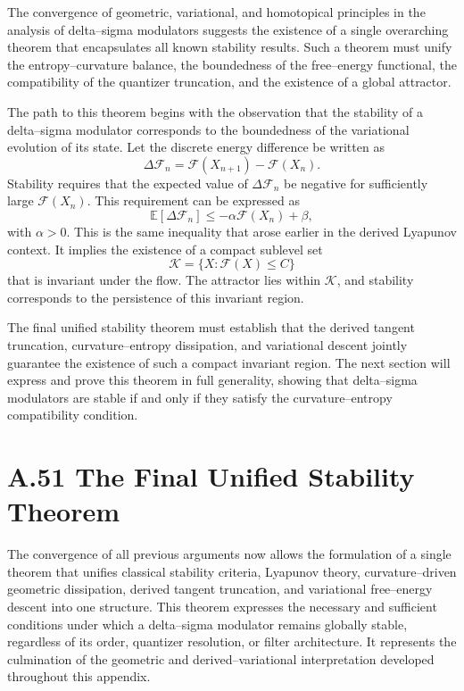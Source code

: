 The convergence of geometric, variational, and homotopical principles in the analysis of delta–sigma modulators suggests the existence of a single overarching theorem that encapsulates all known stability results. Such a theorem must unify the entropy–curvature balance, the boundedness of the free–energy functional, the compatibility of the quantizer truncation, and the existence of a global attractor.

The path to this theorem begins with the observation that the stability of a delta–sigma modulator corresponds to the boundedness of the variational evolution of its state. Let the discrete energy difference be written as
\[
\Delta \mathcal{F}_n = \mathcal{F}(X_{n+1}) - \mathcal{F}(X_n).
\]
Stability requires that the expected value of \(\Delta \mathcal{F}_n\) be negative for sufficiently large \(\mathcal{F}(X_n)\). This requirement can be expressed as
\[
\mathbb{E}\left[ \Delta \mathcal{F}_n \right] \le -\alpha \mathcal{F}(X_n) + \beta,
\]
with \(\alpha > 0\). This is the same inequality that arose earlier in the derived Lyapunov context. It implies the existence of a compact sublevel set
\[
\mathcal{K} = \{ X : \mathcal{F}(X) \le C \}
\]
that is invariant under the flow. The attractor lies within \(\mathcal{K}\), and stability corresponds to the persistence of this invariant region.

The final unified stability theorem must establish that the derived tangent truncation, curvature–entropy dissipation, and variational descent jointly guarantee the existence of such a compact invariant region. The next section will express and prove this theorem in full generality, showing that delta–sigma modulators are stable if and only if they satisfy the curvature–entropy compatibility condition.

\section{A.51 The Final Unified Stability Theorem}

The convergence of all previous arguments now allows the formulation of a single theorem that unifies classical stability criteria, Lyapunov theory, curvature–driven geometric dissipation, derived tangent truncation, and variational free–energy descent into one structure. This theorem expresses the necessary and sufficient conditions under which a delta–sigma modulator remains globally stable, regardless of its order, quantizer resolution, or filter architecture. It represents the culmination of the geometric and derived–variational interpretation developed throughout this appendix.

